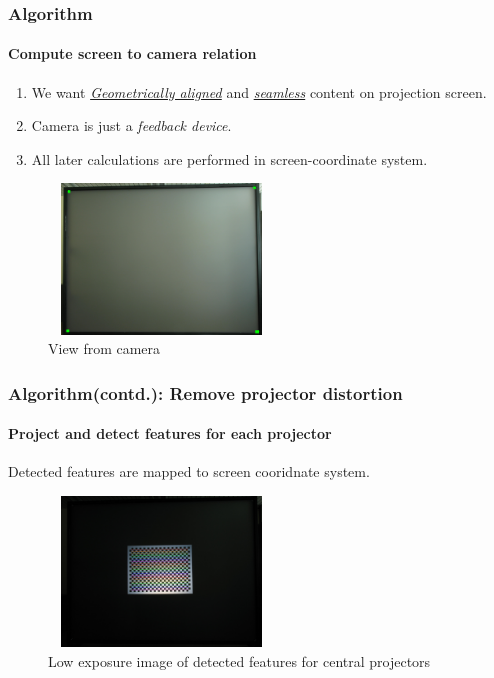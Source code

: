 \documentclass{beamer}
\begin{document}
\begin{frame}
\frametitle{Algorithm}
\framesubtitle{Compute screen to camera relation}
\begin{enumerate}
\item We want \hyperlink{concept}{\textit{Geometrically aligned}} and \hyperlink{concept}{\textit{seamless}} content on projection screen.
\item Camera is just a \textit{feedback device}.
\item All later calculations are performed in screen-coordinate system.
\end{enumerate}

\begin{figure}
\includegraphics[width=6cm, height = 4cm]{figures/debug_image_features.jpg}
\caption{View from camera}
\end{figure}
\end{frame}


\begin{frame}
\frametitle{Algorithm(contd.): Remove projector distortion}
\framesubtitle{Project and detect features for each projector}
Detected features are mapped to screen cooridnate system.

\begin{figure}
\includegraphics[width=6cm, height=4cm]{figures/detected_corners.jpg}
\caption{Low exposure image of detected features for central projectors}
\end{figure}

\end{frame}
\end{document}
